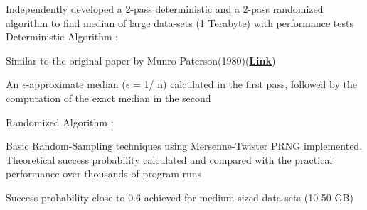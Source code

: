 \documentclass[letterpaper]{Formatting}
\begin{document}
\begin{minipage}[t]{0.66\textwidth}
Independently developed a 2-pass deterministic and a 2-pass randomized algorithm to find median of large data-sets (1 Terabyte) with performance tests\\\vspace{1ex}
Deterministic Algorithm :\vspace{1ex}
\vspace{\topsep} %
\footnotesize {
\begin{tightitemize}
\item Similar to the original paper by Munro-Paterson(1980)(\textbf{\href{http://polylogblog.files.wordpress.com/2009/08/80munro-median.pdf}{Link}})
\item An $\epsilon$-approximate median ($\epsilon$ = 1/ n) calculated in the first pass, followed by the computation of the exact median in the second
\end{tightitemize}
}
\vspace{2ex}
\small Randomized Algorithm :\vspace{0.5ex}
\vspace{\topsep} %
\footnotesize{
\begin{tightitemize}
\item Basic Random-Sampling techniques using Mersenne-Twister PRNG implemented. Theoretical success probability calculated and compared with the practical performance over thousands of program-runs
\item Success probability close to 0.6 achieved for medium-sized data-sets (10-50 GB)
\end{tightitemize}
}
\sectionspace %
\vspace{2ex}

\\\vspace{0.5ex}
\vspace{1ex}


\end{minipage}
\end{document}
